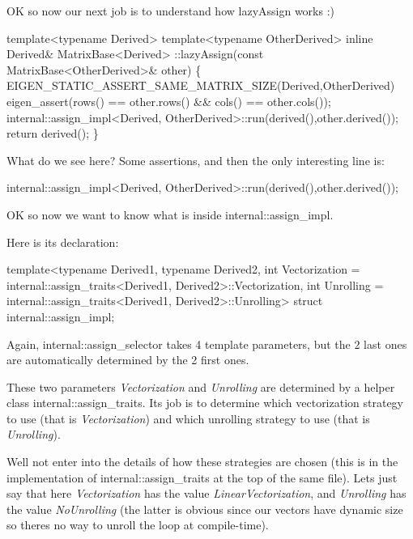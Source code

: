 OK so now our next job is to understand how lazy\+Assign works \+:)


\begin{DoxyCode}
\textcolor{keyword}{template}<\textcolor{keyword}{typename} Derived>
\textcolor{keyword}{template}<\textcolor{keyword}{typename} OtherDerived>
\textcolor{keyword}{inline} Derived& MatrixBase<Derived>
  ::lazyAssign(\textcolor{keyword}{const} MatrixBase<OtherDerived>& other)
\{
  EIGEN\_STATIC\_ASSERT\_SAME\_MATRIX\_SIZE(Derived,OtherDerived)
  eigen\_assert(rows() == other.rows() && cols() == other.cols());
  internal::assign\_impl<Derived, OtherDerived>::run(derived(),other.derived());
  \textcolor{keywordflow}{return} derived();
\}
\end{DoxyCode}


What do we see here? Some assertions, and then the only interesting line is\+: 
\begin{DoxyCode}
internal::assign\_impl<Derived, OtherDerived>::run(derived(),other.derived());
\end{DoxyCode}


OK so now we want to know what is inside internal\+::assign\+\_\+impl.

Here is its declaration\+: 
\begin{DoxyCode}
\textcolor{keyword}{template}<\textcolor{keyword}{typename} Derived1, \textcolor{keyword}{typename} Derived2,
         \textcolor{keywordtype}{int} Vectorization = internal::assign\_traits<Derived1, Derived2>::Vectorization,
         \textcolor{keywordtype}{int} Unrolling = internal::assign\_traits<Derived1, Derived2>::Unrolling>
\textcolor{keyword}{struct }internal::assign\_impl;
\end{DoxyCode}
 Again, internal\+::assign\+\_\+selector takes 4 template parameters, but the 2 last ones are automatically determined by the 2 first ones.

These two parameters {\itshape Vectorization} and {\itshape Unrolling} are determined by a helper class internal\+::assign\+\_\+traits. Its job is to determine which vectorization strategy to use (that is {\itshape Vectorization}) and which unrolling strategy to use (that is {\itshape Unrolling}).

We\textquotesingle{}ll not enter into the details of how these strategies are chosen (this is in the implementation of internal\+::assign\+\_\+traits at the top of the same file). Let\textquotesingle{}s just say that here {\itshape Vectorization} has the value {\itshape Linear\+Vectorization}, and {\itshape Unrolling} has the value {\itshape No\+Unrolling} (the latter is obvious since our vectors have dynamic size so there\textquotesingle{}s no way to unroll the loop at compile-\/time).

